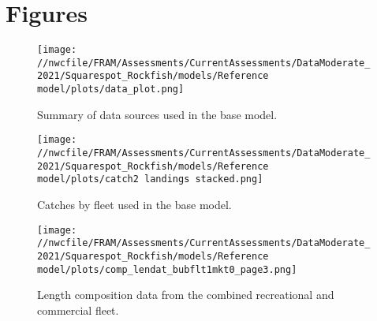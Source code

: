 \documentclass[11pt,
  english,
  a4paper,
]{article}
\begin{document}
\newpage

\clearpage


\hypertarget{figures}{%
\section{Figures}\label{figures}}

\leavevmode\tagmcend\tagstructend


\begin{figure}
\centering
\texttt{[image: //nwcfile/FRAM/Assessments/CurrentAssessments/DataModerate\_2021/Squarespot\_Rockfish/models/Reference model/plots/data\_plot.png]}
\caption{Summary of data sources used in the base model.\label{fig:data-plot}}
\end{figure}

\tagmcend\tagstructend


\begin{figure}
\centering
\texttt{[image: //nwcfile/FRAM/Assessments/CurrentAssessments/DataModerate\_2021/Squarespot\_Rockfish/models/Reference model/plots/catch2 landings stacked.png]}
\caption{Catches by fleet used in the base model.\label{fig:catch}}
\end{figure}

\tagmcend\tagstructend


\begin{figure}
\centering
\texttt{[image: //nwcfile/FRAM/Assessments/CurrentAssessments/DataModerate\_2021/Squarespot\_Rockfish/models/Reference model/plots/comp\_lendat\_bubflt1mkt0\_page3.png]}
\caption{Length composition data from the combined recreational and commercial fleet.\label{fig:rec-com-len-data}}
\end{figure}

\tagmcend\tagstructend

\end{document}
